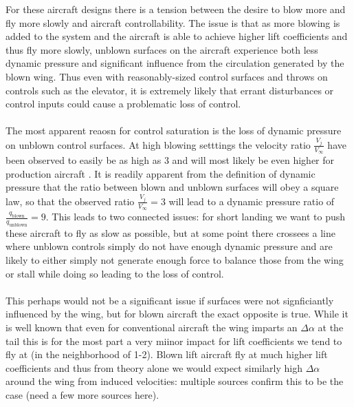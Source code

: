 For these aircraft designs there is a tension between the desire to blow more and fly more slowly and aircraft controllability.
The issue is that as more blowing is added to the system and the aircraft is able to achieve higher lift coefficients and thus fly more slowly, unblown surfaces on the aircraft experience both less dynamic pressure and significant influence from the circulation generated by the blown wing. 
Thus even with reasonably-sized control surfaces and throws on controls such as the elevator, it is extremely likely that errant disturbances or control inputs could cause a problematic loss of control. \\
\\
The most apparent reaosn for control saturation is the loss of dynamic pressure on unblown control surfaces. 
At high blowing setttings the velocity ratio $\frac{V_j}{V_\infty}$ have been observed to easily be as high as 3 \cite{long_parametric_2021} and will most likely be even higher for production aircraft \cite{courtin_performance_nodate}. 
It is readily apparent from the definition of dynamic pressure that the ratio between blown and unblown surfaces will obey a square law, so that the observed ratio $\frac{V_j}{V_\infty} = 3$ will lead to a dynamic pressure ratio of $\frac{q_\mathrm{blown}}{q_\mathrm{unblown}} = 9$. 
This leads to two connected issues: for short landing we want to push these aircraft to fly as slow as possible, but at some point there crossees a line where unblown controls simply do not have enough dynamic pressure and are likely to either simply not generate enough force to balance those from the wing or stall while doing so leading to the loss of control. \\
\\
This perhaps would not be a significant issue if surfaces were not signficiantly influenced by the wing, but for blown aircraft the exact opposite is true. 
While it is well known that even for conventional aircraft the wing imparts an $\Delta\alpha$ at the tail this is for the most part a very miinor impact for lift coefficients we tend to fly at (in the neighborhood of 1-2). 
Blown lift aircraft fly at much higher lift coefficients and thus from theory alone we would expect similarly high $\Delta\alpha$ around the wing from induced velocities: multiple sources confirm this to be the case \cite{courtin_performance_nodate} \cite{courtin_flight_2020} (need a few more sources here).
